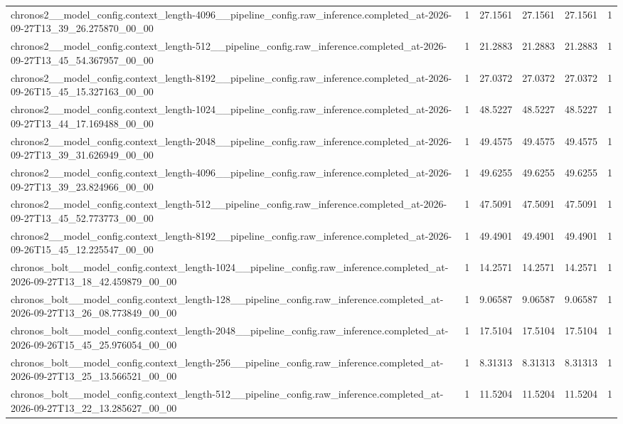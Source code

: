 \begin{tabular}{llllll}
chronos2\_\_model\_config.context\_length-4096\_\_pipeline\_config.raw\_inference.completed\_at-2026-09-27T13\_39\_26.275870\_00\_00 & 1 & 27.1561 & 27.1561 & 27.1561 & 1 \\
chronos2\_\_model\_config.context\_length-512\_\_pipeline\_config.raw\_inference.completed\_at-2026-09-27T13\_45\_54.367957\_00\_00 & 1 & 21.2883 & 21.2883 & 21.2883 & 1 \\
chronos2\_\_model\_config.context\_length-8192\_\_pipeline\_config.raw\_inference.completed\_at-2026-09-26T15\_45\_15.327163\_00\_00 & 1 & 27.0372 & 27.0372 & 27.0372 & 1 \\
chronos2\_\_model\_config.context\_length-1024\_\_pipeline\_config.raw\_inference.completed\_at-2026-09-27T13\_44\_17.169488\_00\_00 & 1 & 48.5227 & 48.5227 & 48.5227 & 1 \\
chronos2\_\_model\_config.context\_length-2048\_\_pipeline\_config.raw\_inference.completed\_at-2026-09-27T13\_39\_31.626949\_00\_00 & 1 & 49.4575 & 49.4575 & 49.4575 & 1 \\
chronos2\_\_model\_config.context\_length-4096\_\_pipeline\_config.raw\_inference.completed\_at-2026-09-27T13\_39\_23.824966\_00\_00 & 1 & 49.6255 & 49.6255 & 49.6255 & 1 \\
chronos2\_\_model\_config.context\_length-512\_\_pipeline\_config.raw\_inference.completed\_at-2026-09-27T13\_45\_52.773773\_00\_00 & 1 & 47.5091 & 47.5091 & 47.5091 & 1 \\
chronos2\_\_model\_config.context\_length-8192\_\_pipeline\_config.raw\_inference.completed\_at-2026-09-26T15\_45\_12.225547\_00\_00 & 1 & 49.4901 & 49.4901 & 49.4901 & 1 \\
chronos\_bolt\_\_model\_config.context\_length-1024\_\_pipeline\_config.raw\_inference.completed\_at-2026-09-27T13\_18\_42.459879\_00\_00 & 1 & 14.2571 & 14.2571 & 14.2571 & 1 \\
chronos\_bolt\_\_model\_config.context\_length-128\_\_pipeline\_config.raw\_inference.completed\_at-2026-09-27T13\_26\_08.773849\_00\_00 & 1 & 9.06587 & 9.06587 & 9.06587 & 1 \\
chronos\_bolt\_\_model\_config.context\_length-2048\_\_pipeline\_config.raw\_inference.completed\_at-2026-09-26T15\_45\_25.976054\_00\_00 & 1 & 17.5104 & 17.5104 & 17.5104 & 1 \\
chronos\_bolt\_\_model\_config.context\_length-256\_\_pipeline\_config.raw\_inference.completed\_at-2026-09-27T13\_25\_13.566521\_00\_00 & 1 & 8.31313 & 8.31313 & 8.31313 & 1 \\
chronos\_bolt\_\_model\_config.context\_length-512\_\_pipeline\_config.raw\_inference.completed\_at-2026-09-27T13\_22\_13.285627\_00\_00 & 1 & 11.5204 & 11.5204 & 11.5204 & 1 \\

\end{tabular}
